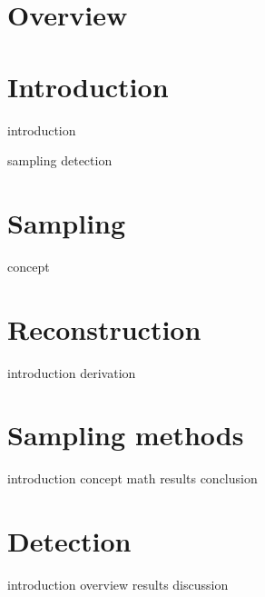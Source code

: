 \documentclass[a4paper, openany, oneside]{memoir}
\begin{document}
\chapter{Overview}

\chapter{Introduction}
{introduction}

{sampling}
{detection}


\chapter{Sampling}

{concept}

\chapter{Reconstruction}

{introduction}
{derivation}

\chapter{Sampling methods}

{introduction}
{concept}
{math} 
{results}
{conclusion}


\chapter{Detection}

{introduction}
{overview}
{results}
{discussion}
\end{document}
